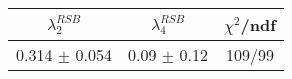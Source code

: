 \begin{tabular}{c|c||c}
$\lambda_{2}^{RSB}$ & $\lambda_4^{RSB}$ & $\chi^{2}$/ndf \\
\hline
0.314 $\pm$ 0.054 & 0.09 $\pm$ 0.12 & 109/99\\
\end{tabular}
